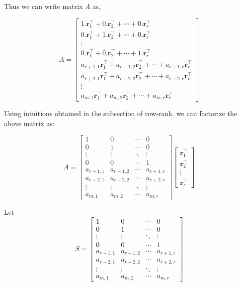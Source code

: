 \documentclass[a4paper]{article}
\begin{document}
Thus we can write matrix $A$ as,

\begin{equation}
A = \begin{bmatrix}
1.\boldsymbol{r}_1^{\top}+ 0.\boldsymbol{r}_2^{\top} + \cdots + 0.\boldsymbol{r}_r^{\top}   \\ 0.\boldsymbol{r}_1^{\top}+ 1.\boldsymbol{r}_2^{\top} + \cdots + 0.\boldsymbol{r}_r^{\top}  \\ \vdots \\ 
0.\boldsymbol{r}_1^{\top}+ 0.\boldsymbol{r}_2^{\top} + \cdots + 1.\boldsymbol{r}_r^{\top} \\
a_{r+1,1}\boldsymbol{r}_{1}^{\top} + a_{r+1,2}\boldsymbol{r}_{2}^{\top} + \cdots + a_{r+1,r}\boldsymbol{r}_{r}^{\top}\\ 
a_{r+2,1}\boldsymbol{r}_{1}^{\top} + a_{r+2,2}\boldsymbol{r}_{2}^{\top} + \cdots + a_{r+2,r}\boldsymbol{r}_{r}^{\top}\\ \vdots \\ 
a_{m,1}\boldsymbol{r}_{1}^{\top} + a_{m,2}\boldsymbol{r}_{2}^{\top} + \cdots + a_{m,r}\boldsymbol{r}_{r}^{\top}
\end{bmatrix}
\end{equation}

Using intuitions obtained in the subsection of row-rank, we can factorize the above matrix as:

\begin{equation}
A = \begin{bmatrix}
1 & 0 & \cdots & 0   \\ 
0 & 1 & \cdots & 0   \\ 
\vdots & \vdots & \ddots & \vdots\\ 
0 & 0 & \cdots & 1 \\
a_{r+1,1} & a_{r+1,2} &\cdots & a_{r+1,r}\\ 
a_{r+2,1} &  a_{r+2,2} &\cdots & a_{r+2,r}\\ 
\vdots & \vdots & \ddots & \vdots\\ 
a_{m,1}& a_{m,2}& \cdots & a_{m,r}
\end{bmatrix} \begin{bmatrix}
\boldsymbol{r}_1^{\top} \\
\boldsymbol{r}_2^{\top} \\
\vdots \\
\boldsymbol{r}_r^{\top}
\end{bmatrix}
\end{equation}

Let \begin{equation}
S = \begin{bmatrix}
1 & 0 & \cdots & 0   \\ 
0 & 1 & \cdots & 0   \\ 
\vdots & \vdots & \ddots & \vdots\\ 
0 & 0 & \cdots & 1 \\
a_{r+1,1} & a_{r+1,2} &\cdots & a_{r+1,r}\\ 
a_{r+2,1} &  a_{r+2,2} &\cdots & a_{r+2,r}\\ 
\vdots & \vdots & \ddots & \vdots\\ 
a_{m,1}& a_{m,2}& \cdots & a_{m,r}
\end{bmatrix}
\end{equation}
\end{document}
